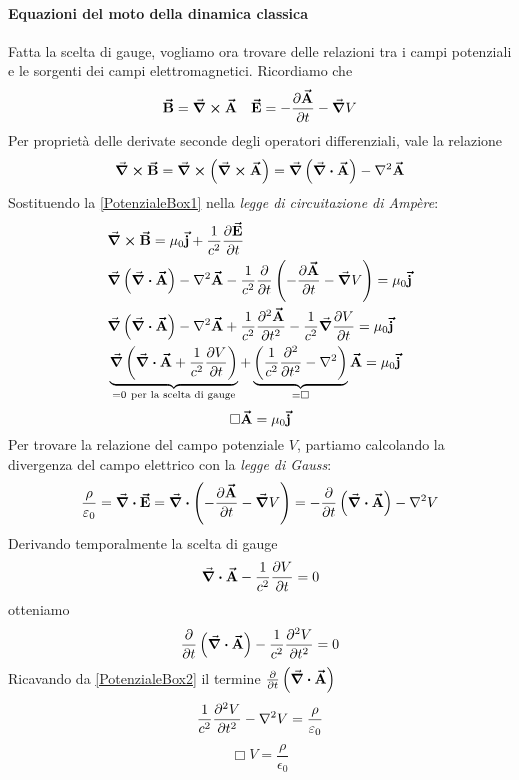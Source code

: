 \paragraph{Equazioni del moto della dinamica classica}
Fatta la scelta di gauge, vogliamo ora trovare delle relazioni tra i campi potenziali e le sorgenti dei campi elettromagnetici. Ricordiamo che
\begin{align*}
	\vb*{\va{B}}=\curl{\vb*{\va{A}}} && \vb*{\va{E}}=-\pdv{\vb*{\va{A}}}{t}-\grad{V}
\end{align*}
Per proprietà delle derivate seconde degli operatori differenziali, vale la relazione
\begin{equation}
	\curl{\vba{B}}=\curl{\left(\curl{\vba{A}}\right)}=\grad{\left(\div{\vba{A}}\right)}-\laplacian{\vba{A}}\label{PotenzialeBox1}
\end{equation}
Sostituendo la \eqref{PotenzialeBox1} nella \textit{legge di circuitazione di Ampère}:
\begin{align*}
	&\curl{\vba{B}}=\mu_0\vba{j}+\frac{1}{c^2}\pdv{\vba{E}}{t}\\
	&\grad{\left(\div{\vba{A}}\right)}-\laplacian{\vba{A}}-\frac{1}{c^2}\pdv{t}\left(-\pdv{\vba{A}}{t}-\grad{V}\right)=\mu_0\vba{j}\\
	&\grad{\left(\div{\vba{A}}\right)}-\laplacian{\vba{A}}+\frac{1}{c^2}\pdv[2]{\vba{A}}{t}-\frac{1}{c^2}\grad{\pdv{V}{t}}=\mu_0\vba{j}\\
	&\underbrace{\grad{\left(\div{\vba{A}}+\frac{1}{c^2}\pdv{V}{t}\right)}}_{=0\ \text{per la scelta di gauge}}+\underbrace{\left(\frac{1}{c^2}\pdv[2]{t}-\laplacian\right)}_{=\Box}\vba{A}=\mu_0\vba{j}
\end{align*}
\begin{equation}
	\Box{\vb*{\va{A}}}=\mu_0\vb*{\va{j}}
\end{equation}
Per trovare la relazione del campo potenziale $V$, partiamo calcolando la divergenza del campo elettrico con la \textit{legge di Gauss}:
\begin{equation}
	\frac{\rho}{\epsilon_0}=\div{\vba{E}}=\div{\left(-\pdv{\vba{A}}{t}-\grad{V}\right)}=-\pdv{t}\left(\div{\vba{A}}\right)-\laplacian{V}
\end{equation}
Derivando temporalmente la scelta di gauge
\begin{equation*}
	\div{\vb*{\va{A}}}-\frac{1}{c^2}\pdv{V}{t}=0
\end{equation*}
otteniamo
\begin{equation}
	\pdv{t}\left(\div{\vb*{\va{A}}}\right)-\frac{1}{c^2}\pdv[2]{V}{t}=0 \label{PotenzialeBox2} 
\end{equation}
Ricavando da \eqref{PotenzialeBox2} il termine $\pdv{t}\left(\div{\vb*{\va{A}}}\right)$
\begin{equation*}
	\frac{1}{c^2}\pdv[2]{V}{t}-\laplacian{V}=\frac{\rho}{\epsilon_0}
\end{equation*}
\begin{equation}
	\Box{V}=\frac{\rho}{\epsilon_0}
\end{equation}
